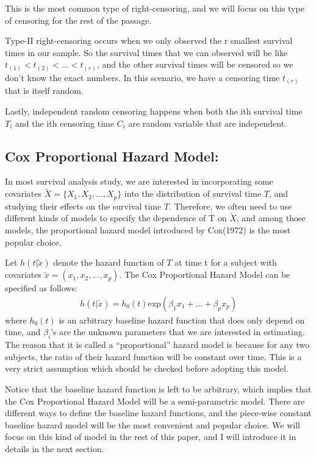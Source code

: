 \documentclass[]{article}
\begin{document}
This is the most common type of right-censoring, and we will focus on
this type of censoring for the rest of the passage.

Type-II right-censoring occurs when we only observed the r smallest
survival times in our sample. So the survival times that we can observed
will be like \(t_{(1)}<t_{(2)}<...<t_{(r)}\), and the other survival
times will be censored so we don't know the exact numbers. In this
scenario, we have a censoring time \(t_{(r)}\) that is itself random.

Lastly, independent random censoring happens when both the ith survival
time \(T_i\) and the ith censoring time \(C_i\) are random variable that
are independent.

\hypertarget{cox-proportional-hazard-model}{%
\subsection{Cox Proportional Hazard
Model:}\label{cox-proportional-hazard-model}}

In most survival analysis study, we are interested in incorporating some
covariates \(\tilde{X} =\{X_1,X_2,...,X_p\}\) into the distribution of
survival time \(T\), and studying their effects on the survival time
\(T\). Therefore, we often need to use different kinds of models to
specify the dependence of T on \(\tilde{X}\), and among those models,
the proportional hazard model introduced by Cox(1972) is the most
popular choice.

Let \(h(t|\tilde{x})\) denote the hazard function of \(T\) at time t for
a subject with covariates \(\tilde{x} = (x_1,x_2,...,x_p)\). The Cox
Proportional Hazard Model can be specified as follows:
\begin{equation}\begin{aligned}\label{eqn:CoxHazardModel}
h(t|\tilde{x}) = h_0(t)\text{exp}(\beta_1x_1+...+\beta_px_p)
\end{aligned}\end{equation} where \(h_0(t)\) is an arbitrary baseline
hazard function that does only depend on time, and \(\beta_i\)'s are the
unknown parameters that we are interested in estimating. The reason that
it is called a ``proportional'' hazard model is because for any two
subjects, the ratio of their hazard function will be constant over time.
This is a very strict assumption which should be checked before adopting
this model.

Notice that the baseline hazard function is left to be arbitrary, which
implies that the Cox Proportional Hazard Model will be a semi-parametric
model. There are different ways to define the baseline hazard functions,
and the piece-wise constant baseline hazard model will be the most
convenient and popular choice. We will focus on this kind of model in
the rest of this paper, and I will introduce it in details in the next
section.
\end{document}
